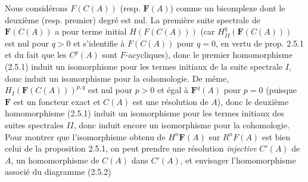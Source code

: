 Nous considérons $F(C(A))$ (resp. $\mathbf F(A)$) comme un bicomplexe dont le
deuxième (resp. premier) degré est nul. La première suite spectrale de
$\mathbf F(C(A))$ a pour terme initial $H(F(C(A)))$ (car
$H_{II}^q(\mathbf F(C(A)))$ est nul pour $q>0$ et s'identifie à
$F(C(A))$ pour $q=0$, en vertu de prop. 2.5.1 et du fait que les $C^p(A)$ sont
$F$-acycliques), donc le premier homomorphisme (2.5.1) induit un isomorphisme
pour les termes initiaux de la suite spectrale $I$, donc induit un
isomorphisme pour la cohomologie. De même,
$H_I(\mathbf F(C(A)))^{p,q}$ est nul pour $p>0$ et égal à
$\mathbf F^q(A)$ pour $p=0$ (puisque $\mathbf F$ est un foncteur exact et
$C(A)$ est une résolution de $A$), donc le deuxième homomorphisme (2.5.1)
induit un isomorphisme pour les termes initiaux des suites spectrales $II$,
donc induit encore un isomorphisme pour la cohomologie. Pour montrer que
l'isomorphisme obtenu de $H^n\mathbf F(A)$ sur $R^nF(A)$ est bien celui de la
proposition 2.5.1, on peut prendre une résolution \textit{injective} $C'(A)$
de $A$, un homomorphisme de $C(A)$ dans $C'(A)$, et envisager
l'homomorphisme associé du diagramme (2.5.2)

